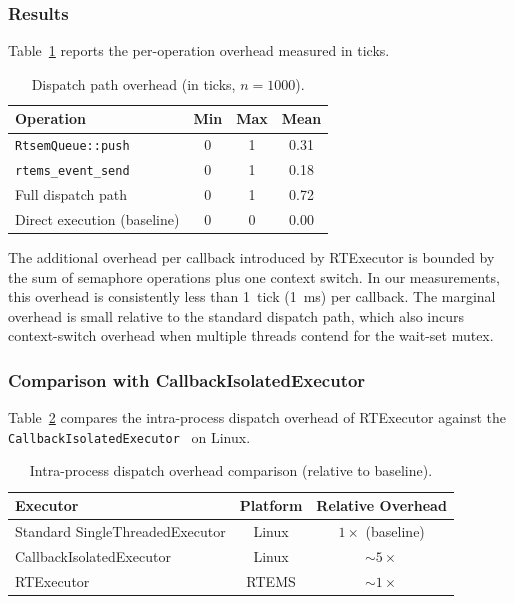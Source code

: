 \subsubsection{Results}

Table~\ref{tab:overhead} reports the per-operation overhead measured in ticks.

\begin{table}[t]
\centering
\caption{Dispatch path overhead (in ticks, $n=1000$).}
\label{tab:overhead}
\begin{tabular}{lccc}
\hline
\textbf{Operation} & \textbf{Min} & \textbf{Max} & \textbf{Mean} \\
\hline
\texttt{RtsemQueue::push}    & 0 & 1 & 0.31 \\
\texttt{rtems\_event\_send}   & 0 & 1 & 0.18 \\
Full dispatch path            & 0 & 1 & 0.72 \\
Direct execution (baseline)   & 0 & 0 & 0.00 \\
\hline
\end{tabular}
\end{table}

The additional overhead per callback introduced by RTExecutor is bounded by the sum of semaphore operations plus one context switch.
In our measurements, this overhead is consistently less than 1~tick (1~ms) per callback.
The marginal overhead is small relative to the standard dispatch path, which also incurs context-switch overhead when multiple threads contend for the wait-set mutex.

\subsubsection{Comparison with CallbackIsolatedExecutor}

Table~\ref{tab:overhead_compare} compares the intra-process dispatch overhead of RTExecutor against the \texttt{CallbackIsolatedExecutor}~\cite{ishikawa2025rtas} on Linux.

\begin{table}[t]
\centering
\caption{Intra-process dispatch overhead comparison (relative to baseline).}
\label{tab:overhead_compare}
\begin{tabular}{lcc}
\hline
\textbf{Executor} & \textbf{Platform} & \textbf{Relative Overhead} \\
\hline
Standard SingleThreadedExecutor & Linux  & $1\times$ (baseline) \\
CallbackIsolatedExecutor        & Linux  & $\sim 5\times$ \\
RTExecutor                      & RTEMS  & $\sim 1\times$ \\
\hline
\end{tabular}
\end{table}

